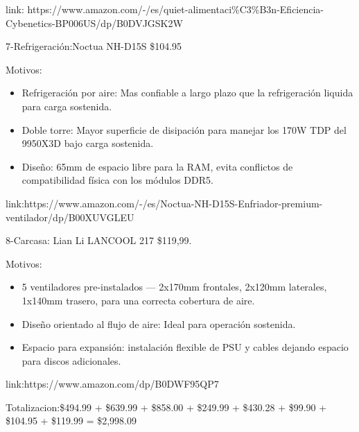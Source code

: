 \documentclass[14pt]{extarticle}
\begin{document}
link:
https://www.amazon.com/-/es/quiet-alimentaci\%C3\%B3n-Eficiencia-Cybenetics-BP006US/dp/B0DVJGSK2W

7-Refrigeración:Noctua NH-D15S \$104.95

Motivos:

\begin{itemize}
\item
  Refrigeración por aire: Mas confiable a largo plazo que la
  refrigeración liquida para carga sostenida.
\item
  Doble torre: Mayor superficie de disipación para manejar los 170W TDP
  del 9950X3D bajo carga sostenida.
\item
  Diseño: 65mm de espacio libre para la RAM, evita conflictos de
  compatibilidad física con los módulos DDR5.
\end{itemize}

link:https://www.amazon.com/-/es/Noctua-NH-D15S-Enfriador-premium-ventilador/dp/B00XUVGLEU

8-Carcasa: Lian Li LANCOOL 217 \$119,99.

Motivos:

\begin{itemize}
\item
  5 ventiladores pre-instalados --- 2x170mm frontales, 2x120mm
  laterales, 1x140mm trasero, para una correcta cobertura de aire.
\item
  Diseño orientado al flujo de aire: Ideal para operación sostenida.
\item
  Espacio para expansión: instalación flexible de PSU y cables dejando
  espacio para discos adicionales.
\end{itemize}

link:https://www.amazon.com/dp/B0DWF95QP7

Totalizacion:\$494.99 + \$639.99 + \$858.00 + \$249.99 + \$430.28 + \$99.90 + \$104.95 + \$119.99 = \$2,998.09
\end{document}

